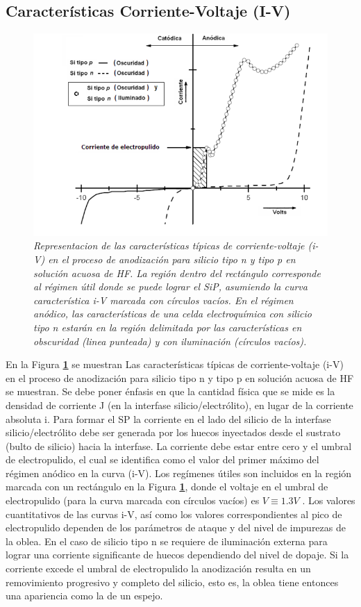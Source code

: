 \documentclass[a4paper,11pt,]{book}
\begin{document}
\subsection{Características Corriente-Voltaje (I-V)}
\begin{figure}[H]
	\centering
	\includegraphics[scale=.55]{../Images/iv}
	\caption{\emph{Representacion de las características típicas de corriente-voltaje (i-V) en el proceso de anodización para
			silicio tipo n y tipo p en solución acuosa de HF. La región dentro del rectángulo corresponde al régimen útil donde se puede lograr el SiP,
			asumiendo la curva característica i-V marcada con círculos vacíos. En el régimen anódico, las características de una celda electroquímica con silicio tipo n estarán en la región delimitada por las características en obscuridad (linea punteada) y con iluminación (círculos vacíos)\cite{110}.}}
	\label{fig:iv}
\end{figure}
En la Figura \textbf{\ref{fig:iv}} se muestran Las características típicas de corriente-voltaje (i-V) en el proceso de anodización para silicio tipo n y tipo p en solución acuosa de HF se muestran\cite{110}. Se debe poner énfasis en que la cantidad física que se mide es la densidad de corriente
J (en la interfase silicio/electrólito), en lugar de la corriente absoluta i. Para formar el SP la corriente en el lado del silicio de la interfase silicio/electrólito debe ser generada por los huecos inyectados desde el sustrato (bulto de silicio) hacia la interfase. La corriente debe estar entre cero y el umbral de electropulido, el cual se identifica como el valor del primer máximo del régimen anódico en la curva (i-V). Los regímenes útiles son incluidos en la región marcada con un rectángulo en la  Figura \textbf{\ref{fig:iv}}, donde el voltaje en el umbral de electropulido (para la curva marcada con círculos vacíos) es $V \equiv 1.3V$ . Los valores cuantitativos de las curvas i-V, así como los valores correspondientes al pico de electropulido dependen de los parámetros de ataque y del nivel de impurezas de la oblea. En el caso de silicio tipo n se requiere de iluminación externa para lograr una corriente significante de huecos dependiendo del nivel de dopaje. Si la corriente excede el umbral de electropulido la anodización resulta en un removimiento progresivo y completo del silicio, esto es, la oblea tiene entonces una apariencia como la de un espejo.
\end{document}
